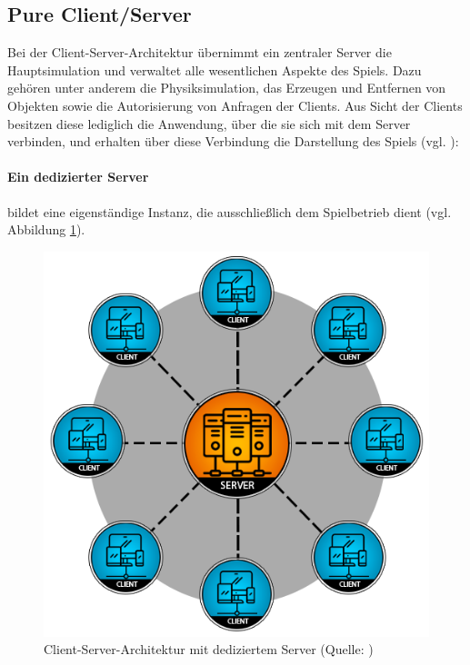 \subsection{Pure Client/Server}
Bei der Client-Server-Architektur übernimmt ein zentraler Server die Hauptsimulation und verwaltet alle wesentlichen Aspekte des Spiels. Dazu gehören unter anderem die Physiksimulation, das Erzeugen und Entfernen von Objekten sowie die Autorisierung von Anfragen der Clients. Aus Sicht der Clients besitzen diese lediglich die Anwendung, über die sie sich mit dem Server verbinden, und erhalten über diese Verbindung die Darstellung des Spiels (vgl. \cite{noauthor_client-server_2024}):
\paragraph{Ein dedizierter Server} bildet eine eigenständige Instanz, die ausschließlich dem Spielbetrieb dient (vgl. Abbildung \ref{fig:dedicated_server}).

\begin{figure}[ht]
\centering
\includegraphics[width=1\linewidth]{content/pictures/ded_server-d5369721966357b9b4d5e1fa96b05b22.png}
\caption{Client-Server-Architektur mit dediziertem Server (Quelle: \cite{noauthor_network_2024})}
\label{fig:dedicated_server}
\end{figure}


